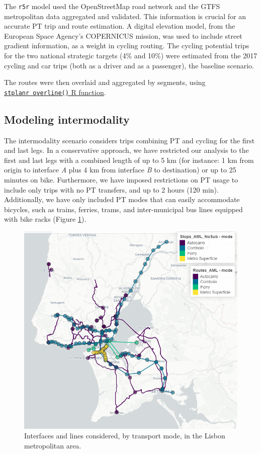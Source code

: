 \documentclass[review, doubleblind, 3p,
authoryear]{elsarticle} %
\begin{document}
The \texttt{r5r} model used the OpenStreetMap road network and the GTFS
metropolitan data aggregated and validated. This information is crucial
for an accurate PT trip and route estimation. A digital elevation model,
from the European Space Agency's COPERNICUS mission, was used to include
street gradient information, as a weight in cycling routing. The cycling
potential trips for the two national strategic targets (4\% and 10\%)
were estimated from the 2017 cycling and car trips (both as a driver and
as a passenger), the baseline scenario.

The routes were then overlaid and aggregated by segments, using
\href{https://docs.ropensci.org/stplanr/reference/overline.html}{\texttt{stplanr\ overline()}
R function}.

\hypertarget{modeling-intermodality}{%
\subsection{Modeling intermodality}\label{modeling-intermodality}}

The intermodality scenario considers trips combining PT and cycling for
the first and last legs. In a conservative approach, we have restricted
our analysis to the first and last legs with a combined length of up to
5 km (for instance: 1 km from origin to interface \emph{A} plus 4 km
from interface \emph{B} to destination) or up to 25 minutes on bike.
Furthermore, we have imposed restrictions on PT usage to include only
trips with no PT transfers, and up to 2 hours (120 min). Additionally,
we have only included PT modes that can easily accommodate bicycles,
such as trains, ferries, trams, and inter-municipal bus lines equipped
with bike racks (Figure \ref{fig:map1}).

\begin{figure}

{\centering \includegraphics[width=0.6\linewidth,]{img/map1} 

}

\caption{Interfaces and lines considered, by transport mode, in the Lisbon metropolitan area.}\label{fig:map1}
\end{figure}
\end{document}

